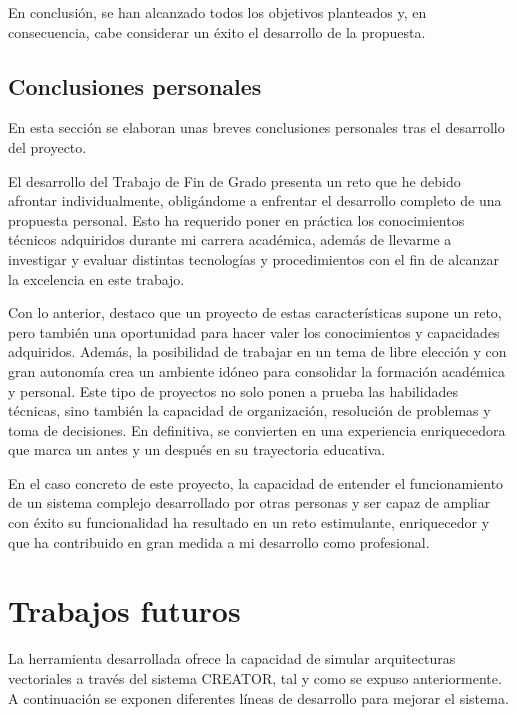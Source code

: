 En conclusión, se han alcanzado todos los objetivos planteados  y, en consecuencia, cabe considerar un éxito el desarrollo de la propuesta.

\subsection{Conclusiones personales}

En esta sección se elaboran unas breves conclusiones personales tras el desarrollo del proyecto.

El desarrollo del Trabajo de Fin de Grado presenta un reto que he debido afrontar individualmente, obligándome a enfrentar el desarrollo completo de una propuesta personal. Esto ha requerido poner en práctica los conocimientos técnicos adquiridos durante mi carrera académica, además de llevarme a investigar y evaluar distintas tecnologías y procedimientos con el fin de alcanzar la excelencia en este trabajo.

Con lo anterior, destaco que un proyecto de estas características supone un reto, pero también una oportunidad para hacer valer los conocimientos y capacidades adquiridos. Además, la posibilidad de trabajar en un tema de libre elección y con gran autonomía crea un ambiente idóneo para consolidar la formación académica y personal. Este tipo de proyectos no solo ponen a prueba las habilidades técnicas, sino también la capacidad de organización, resolución de problemas y toma de decisiones. En definitiva, se convierten en una experiencia enriquecedora que marca un antes y un después en su trayectoria educativa.

En el caso concreto de este proyecto, la capacidad de entender el funcionamiento de un sistema complejo desarrollado por otras personas y ser capaz de ampliar con éxito su funcionalidad ha resultado en un reto estimulante, enriquecedor y que ha contribuido en gran medida a mi desarrollo como profesional.

\section{Trabajos futuros}\label{sec:future-work}

La herramienta desarrollada ofrece la capacidad de simular arquitecturas vectoriales a través del sistema CREATOR, tal y como se expuso anteriormente. A continuación se exponen diferentes líneas de desarrollo para mejorar el sistema.

